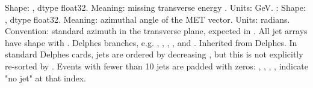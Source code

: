 {}\markdownRendererUlBeginTight
\markdownRendererUlItem Shape: , dtype float32.\markdownRendererUlItemEnd 
\markdownRendererUlItem Meaning: missing transverse energy .\markdownRendererUlItemEnd 
\markdownRendererUlItem Units: GeV.\markdownRendererUlItemEnd 
\markdownRendererUlEndTight \markdownRendererUlItemEnd 
\markdownRendererUlItem {}:\markdownRendererInterblockSeparator
{}\markdownRendererUlBeginTight
\markdownRendererUlItem Shape: , dtype float32.\markdownRendererUlItemEnd 
\markdownRendererUlItem Meaning: azimuthal angle of the MET vector.\markdownRendererUlItemEnd 
\markdownRendererUlItem Units: radians.\markdownRendererUlItemEnd 
\markdownRendererUlItem Convention: standard azimuth in the transverse plane, expected in \markdownRendererInlineMath{[-\pi, \pi)}.\markdownRendererUlItemEnd 
\markdownRendererUlEndTight \markdownRendererUlItemEnd 
\markdownRendererUlEnd \markdownRendererInterblockSeparator
{}
\markdownRendererSectionEnd 
\markdownRendererSectionEnd \markdownRendererSectionBegin
{}\markdownRendererInterblockSeparator
{}All jet arrays have shape  with .\markdownRendererInterblockSeparator
{}\markdownRendererUlBeginTight
\markdownRendererUlItem {} Delphes  branches, e.g. , , , , and .\markdownRendererUlItemEnd 
\markdownRendererUlItem {} Inherited from Delphes. In standard Delphes cards, jets are ordered by decreasing , but this is not explicitly re-sorted by .\markdownRendererUlItemEnd 
\markdownRendererUlItem {} Events with fewer than 10 jets are padded with zeros:\markdownRendererInterblockSeparator
{}\markdownRendererUlBeginTight
\markdownRendererUlItem {}, , , ,  indicate "no jet" at that index.\markdownRendererUlItemEnd 
